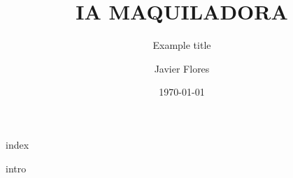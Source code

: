 \documentclass[a4paper,12pt,oneside]{book}
\title{IA MAQUILADORA}
\subtitle{Example title}
\date{\today}
\author{Javier Flores}
\begin{document}
\maketitle
\tableofcontents 

 {index}  %

 {intro}  %


\end{document}
